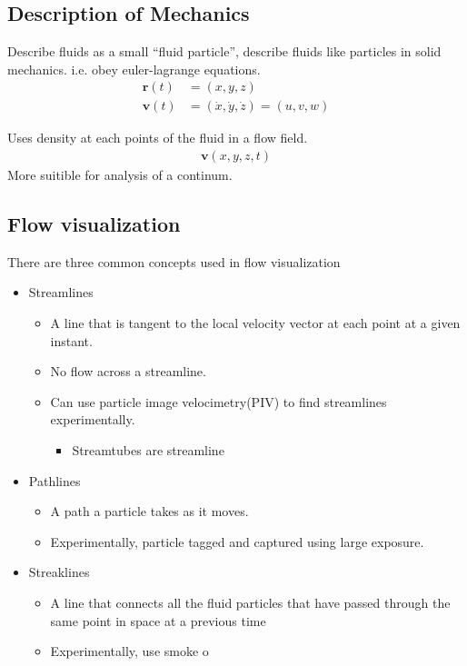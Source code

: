 \documentclass[a4paper]{article}
\numberwithin{equation}{section}
\begin{document}
\subsection{Description of Mechanics}
\begin{definition}
    Describe fluids as a small ``fluid particle'', describe fluids like particles in solid mechanics. i.e. obey euler-lagrange equations.
    \begin{align}
        \mathbf{r}(t)&=(x,y,z)\\
        \mathbf{v}(t)&=(\dot x,\dot y,\dot z)=(u,v,w)
    \end{align}
\end{definition}
\begin{definition}
    Uses density at each points of the fluid in a flow field.
    \begin{align}
        \mathbf v(x,y,z,t)
    \end{align}
    More suitible for analysis of a continum.
\end{definition}
\subsection{Flow visualization}
There are three common concepts used in flow visualization
\begin{itemize}
    \item Streamlines
    \begin{itemize}
        \item A line that is tangent to the local velocity vector at each point at a given instant.
        \item No flow across a streamline.
        \item Can use particle image velocimetry(PIV) to find streamlines experimentally.
        \begin{itemize}
            \item Streamtubes are streamline
        \end{itemize}
    \end{itemize}
    \item Pathlines
    \begin{itemize}
        \item A path a particle takes as it moves.
        \item Experimentally, particle tagged and captured using large exposure.
    \end{itemize}
    \item Streaklines
    \begin{itemize}
        \item A line that connects all the fluid particles that have passed through the same point in space at a previous time
        \item Experimentally, use smoke o
    \end{itemize}
\end{itemize}
\end{document}

